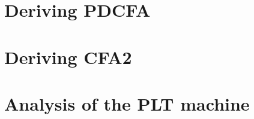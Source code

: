 \documentclass{llncs}
\begin{document}
\section{Deriving PDCFA}
\label{sec:pdcfa}

\section{Deriving CFA2}
\label{sec:cfa2}

\section{Analysis of the PLT machine}
\label{sec:plt}



\end{document}
